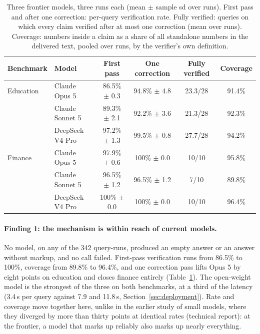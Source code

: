 \documentclass[11pt,a4paper]{article}
\begin{document}
\begin{table}[h]
\centering
\small
\begin{tabular}{llcccc}
\toprule
\textbf{Benchmark} & \textbf{Model} & \textbf{First pass} & \textbf{One correction} & \textbf{Fully verified} & \textbf{Coverage} \\
\midrule
Education & Claude Opus 5 & 86.5\% $\pm$ 0.3 & 94.8\% $\pm$ 4.8 & 23.3/28 & 91.4\% \\
 & Claude Sonnet 5 & 89.3\% $\pm$ 2.1 & 92.2\% $\pm$ 3.6 & 21.3/28 & 92.3\% \\
 & DeepSeek V4 Pro & 97.2\% $\pm$ 1.3 & 99.5\% $\pm$ 0.8 & 27.7/28 & 94.2\% \\
\midrule
Finance & Claude Opus 5 & 97.9\% $\pm$ 0.6 & 100\% $\pm$ 0.0 & 10/10 & 95.8\% \\
 & Claude Sonnet 5 & 96.5\% $\pm$ 1.2 & 96.5\% $\pm$ 1.2 & 7/10 & 89.8\% \\
 & DeepSeek V4 Pro & 100\% $\pm$ 0.0 & 100\% $\pm$ 0.0 & 10/10 & 96.4\% \\
\bottomrule
\end{tabular}
\caption{Three frontier models, three runs each (mean $\pm$ sample sd over runs). First pass and after one correction: per-query verification rate. Fully verified: queries on which every claim verified after at most one correction (mean over runs). Coverage: numbers inside a claim as a share of all standalone numbers in the delivered text, pooled over runs, by the verifier's own definition.}
\label{tab:frontier}
\end{table}

\paragraph{Finding 1: the mechanism is within reach of current models.} No model, on any of the 342 query-runs, produced an empty answer or an answer without markup, and no call failed. First-pass verification runs from 86.5\% to 100\%, coverage from 89.8\% to 96.4\%, and one correction pass lifts Opus 5 by eight points on education and closes finance entirely (Table~\ref{tab:frontier}). The open-weight model is the strongest of the three on both benchmarks, at a third of the latency (3.4\,s per query against 7.9 and 11.8\,s, Section~\ref{sec:deployment}). Rate and coverage move together here, unlike in the earlier study of small models, where they diverged by more than thirty points at identical rates (technical report): at the frontier, a model that marks up reliably also marks up nearly everything.
\end{document}
